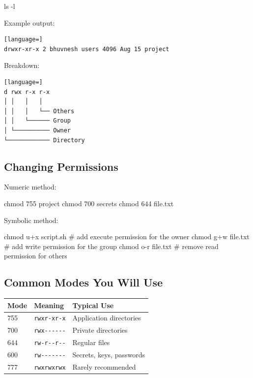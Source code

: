 \documentclass[11pt,a4paper]{article}
\begin{document}
\begin{sh}
ls -l
\end{sh}

Example output:

\begin{lstlisting}[language=]
drwxr-xr-x 2 bhuvnesh users 4096 Aug 15 project
\end{lstlisting}

Breakdown:

\begin{lstlisting}[language=]
d rwx r-x r-x
│ │   │   │
│ │   │   └── Others
│ │   └────── Group
│ └────────── Owner
└──────────── Directory
\end{lstlisting}

\subsection{Changing Permissions}

Numeric method:

\begin{sh}
chmod 755 project
chmod 700 secrets
chmod 644 file.txt
\end{sh}

Symbolic method:

\begin{sh}
chmod u+x script.sh   # add execute permission for the owner
chmod g+w file.txt    # add write permission for the group
chmod o-r file.txt    # remove read permission for others
\end{sh}

\subsection{Common Modes You Will Use}

\begin{center}
\small
\begin{tabular}{@{}l l l@{}}
\toprule
\rowcolor{tablehead}\bfseries Mode & \bfseries Meaning & \bfseries Typical Use \\
\midrule
755 & \texttt{rwxr-xr-x} & Application directories \\
700 & \texttt{rwx-{}-{}-{}-{}-{}-} & Private directories \\
644 & \texttt{rw-r-{}-r-{}-} & Regular files \\
600 & \texttt{rw-{}-{}-{}-{}-{}-{}-} & Secrets, keys, passwords \\
777 & \texttt{rwxrwxrwx} & Rarely recommended \\
\bottomrule
\end{tabular}
\end{center}
\end{document}
